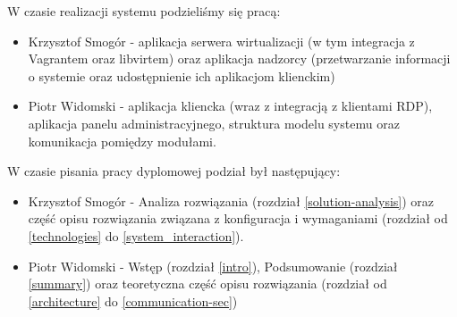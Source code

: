 \documentclass[../wstep.tex]{subfiles}
\begin{document}
W czasie realizacji systemu podzieliśmy się pracą:
\begin{itemize}
    \item Krzysztof Smogór - aplikacja serwera wirtualizacji (w tym integracja z Vagrantem oraz libvirtem) oraz aplikacja nadzorcy (przetwarzanie informacji o systemie oraz udostępnienie ich aplikacjom klienckim)
    \item Piotr Widomski - aplikacja kliencka (wraz z integracją z klientami RDP), aplikacja panelu administracyjnego, struktura modelu systemu oraz komunikacja pomiędzy modułami.
\end{itemize}

W czasie pisania pracy dyplomowej podział był następujący:
\begin{itemize}
    \item Krzysztof Smogór - Analiza rozwiązania (rozdział \ref{solution-analysis}) oraz część opisu rozwiązania związana z konfiguracja i wymaganiami (rozdział od \ref{technologies} do \ref{system_interaction}).
    \item Piotr Widomski - Wstęp (rozdział \ref{intro}), Podsumowanie (rozdział \ref{summary}) oraz teoretyczna część opisu rozwiązania (rozdział od \ref{architecture} do \ref{communication-sec})
\end{itemize}
\end{document}
